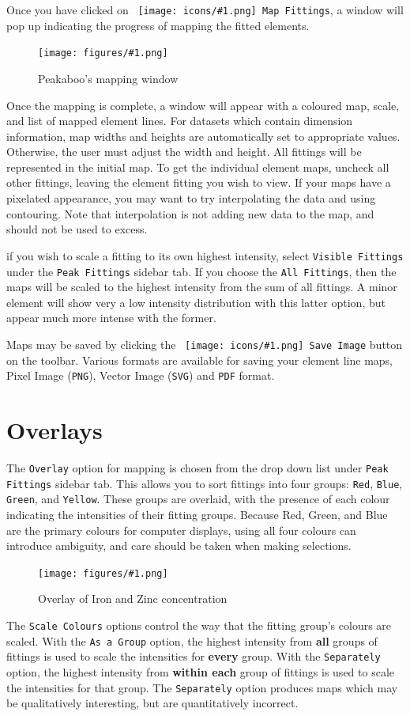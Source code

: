 \documentclass[article,twoside,11pt]{report}
\newcommand{\command}[1]{\texttt{#1}}
\newcommand{\icon}[1]{\texttt{[image: icons/\#1.png]}}
\newcommand{\button}[2]{\ \command{\icon{#1} #2}}
\newcommand{\emphasis}[1]{{\bf #1}}
\newcommand{\screenshot}[2]{%
\begin{figure}[h!]
\centering\texttt{[image: figures/\#1.png]}
\caption{#2}
\end{figure}
}
\newcommand{\tocsection}[1]{\section*{#1}\addcontentsline{toc}{section}{#1}}
\begin{document}
Once you have clicked on \button{map}{Map Fittings}, a window will pop up indicating the
progress of mapping the fitted elements.

\screenshot{map-window}{Peakaboo's mapping window}

Once the mapping is complete, a window will appear with a coloured map, scale, and 
list of mapped element lines. For datasets which contain dimension information, map 
widths and heights are automatically set to appropriate values. Otherwise, the user 
must adjust the width and height. All fittings will be represented in the initial map. 
To get the individual element maps, uncheck all other fittings, leaving the element 
fitting you wish to view. If your maps have a pixelated appearance, you may want to 
try interpolating the data and using contouring. Note that interpolation is not adding 
new data to the map, and should not be used to excess.

if you wish to scale a fitting to its own highest intensity, select \command{Visible Fittings}
under the \command{Peak Fittings} sidebar tab. If you choose the 
\command{All Fittings}, then the maps will be scaled to the highest intensity from 
the sum of all fittings. A minor element will show very a low intensity 
distribution with this latter option, but appear much more intense with the former.

Maps may be saved by clicking the \button{device-camera}{Save Image} button on the toolbar.
Various formats are available for saving your element line maps, 
Pixel Image (\command{PNG}), Vector Image (\command{SVG}) and \command{PDF} format.


\tocsection{Overlays}

The \command{Overlay} option for mapping is chosen from the drop down list under 
\command{Peak Fittings} sidebar tab. This allows you to sort fittings into four groups: 
\command{Red}, \command{Blue}, \command{Green}, and \command{Yellow}. These groups are 
overlaid, with the presence of each colour indicating the intensities of their fitting 
groups. Because Red, Green, and Blue are the primary colours for computer displays, using 
all four colours can introduce ambiguity, and care should be taken when making selections.

\screenshot{map-overlay}{Overlay of Iron and Zinc concentration}

The \command{Scale Colours} options control the way that the fitting group's colours are scaled.
With the \command{As a Group} option, the highest intensity from \emphasis{all} 
groups of fittings is used to scale the intensities for \emphasis{every} group. With the 
\command{Separately} option, the highest intensity from \emphasis{within each} 
group of fittings is used to scale the intensities for that group. The \command{Separately}
option produces maps which may be qualitatively interesting, but are quantitatively 
incorrect.
\end{document}
